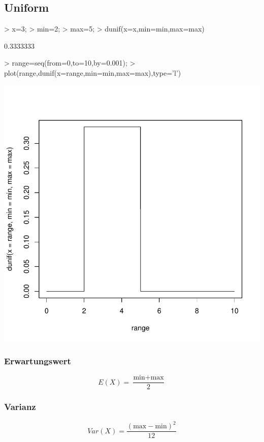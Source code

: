 \subsection{Uniform}
\begin{Schunk}
\begin{Sinput}
> x=3;
> min=2;
> max=5;
> dunif(x=x,min=min,max=max)
\end{Sinput}
\begin{Soutput}
[1] 0.3333333
\end{Soutput}
\begin{Sinput}
> range=seq(from=0,to=10,by=0.001);
> plot(range,dunif(x=range,min=min,max=max),type='l')
\end{Sinput}
\end{Schunk}
\includegraphics{definitionen-017}

\subsubsection{Erwartungswert}
\[ E(X) = \frac{\text{min} + \text{max}}{2} \]

\subsubsection{Varianz}
\[ Var(X) = \frac{(\text{max} - \text{min})^2}{12} \]

